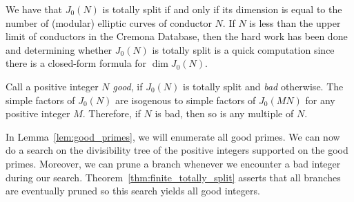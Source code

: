 We have that $J_0(N)$ is totally split if and only if its dimension is equal to
the number of (modular) elliptic curves of conductor $N$. If $N$ is less than
the upper limit of conductors in the Cremona Database, then the hard work has
been done and determining whether $J_0(N)$ is totally split is a quick
computation since there is a closed-form formula for $\dim J_0(N)$.

Call a positive integer $N$ \emph{good}, if $J_0(N)$ is totally split and
\emph{bad} otherwise. The simple factors of $J_0(N)$ are isogenous to simple
factors of $J_0(MN)$ for any positive integer $M$. Therefore, if $N$ is bad,
then so is any multiple of $N$. 

In Lemma~\ref{lem:good_primes}, we will enumerate all good primes. We can now
do a search on the divisibility tree of the positive integers supported on the
good primes. Moreover, we can prune a branch whenever we encounter a bad
integer during our search. Theorem~\ref{thm:finite_totally_split} asserts that
all branches are eventually pruned so this search yields all good integers.

